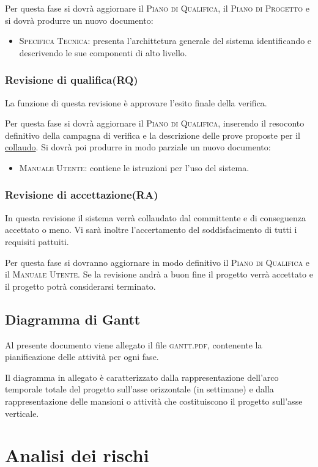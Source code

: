 \documentclass[11pt,a4paper]{article}
\begin{document}
Per questa fase si dovrà aggiornare il \textsc{Piano di Qualifica}, il \textsc{Piano di Progetto} e si dovrà produrre un nuovo documento:
\begin{itemize}
\item \textsc{Specifica Tecnica}: presenta l'archittetura generale del sistema identificando e descrivendo le sue componenti di alto livello.
\end{itemize}
\subsubsection{Revisione di qualifica(RQ)}
La funzione di questa revisione è approvare l'esito finale della verifica.

Per questa fase si dovrà aggiornare il \textsc{Piano di Qualifica}, inserendo il resoconto definitivo della campagna di verifica e la descrizione delle prove proposte per il \underline{collaudo}. Si dovrà poi produrre in modo parziale un nuovo documento:
\begin{itemize}
\item \textsc{Manuale Utente}: contiene le istruzioni per l'uso del sistema.
\end{itemize}
\subsubsection{Revisione di accettazione(RA)}
In questa revisione il sistema verrà collaudato dal committente e di conseguenza accettato o meno.
Vi sarà inoltre l'accertamento del soddisfacimento di tutti i requisiti pattuiti.

Per questa fase si dovranno aggiornare in modo definitivo il \textsc{Piano di Qualifica} e il \textsc{Manuale Utente}.
Se la revisione andrà a buon fine il progetto verrà accettato e il progetto potrà considerarsi terminato.
\subsection{Diagramma di Gantt}
Al presente documento viene allegato il file \textsc{gantt.pdf}, contenente la pianificazione delle attività per ogni fase.

Il diagramma in allegato è caratterizzato dalla rappresentazione dell'arco temporale totale del progetto sull'asse orizzontale (in settimane) e dalla rappresentazione delle mansioni o attività che costituiscono il progetto sull'asse verticale.

\section{Analisi dei rischi}
\end{document}
